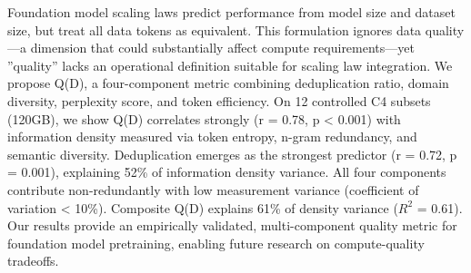 
Foundation model scaling laws predict performance from model size and dataset size, but treat all data tokens as equivalent. This formulation ignores data quality---a dimension that could substantially affect compute requirements---yet ''quality'' lacks an operational definition suitable for scaling law integration. We propose Q(D), a four-component metric combining deduplication ratio, domain diversity, perplexity score, and token efficiency. On 12 controlled C4 subsets (120GB), we show Q(D) correlates strongly (r = 0.78, p < 0.001) with information density measured via token entropy, n-gram redundancy, and semantic diversity. Deduplication emerges as the strongest predictor (r = 0.72, p = 0.001), explaining 52\% of information density variance. All four components contribute non-redundantly with low measurement variance (coefficient of variation < 10\%). Composite Q(D) explains 61\% of density variance ($R^2$ = 0.61). Our results provide an empirically validated, multi-component quality metric for foundation model pretraining, enabling future research on compute-quality tradeoffs.
